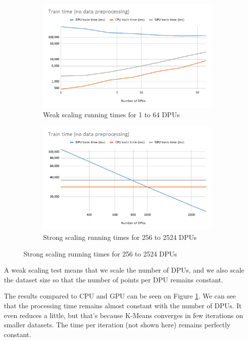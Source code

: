 \begin{figure}
    \begin{subfigure}{0.48\linewidth}
        \includegraphics[width=\linewidth]{figures/KMeansweak.pdf}
        \caption{Weak scaling running times for 1 to 64 DPUs}
        \label{fig:KMeansweak}
    \end{subfigure}
    \begin{subfigure}{0.48\linewidth}
        \includegraphics[width=\linewidth]{figures/KMeansstrong.pdf}
        \caption{Strong scaling running times for 256 to 2524 DPUs}
        \label{fig:KMeansstrong}
    \end{subfigure}
\end{figure}

A weak scaling test means that we scale the number of DPUs, and we also scale the dataset size so that the number of points per DPU remains constant.

The results compared to CPU and GPU can be seen on Figure \ref{fig:KMeansweak}. We can see that the processing time remains almost constant with the number of DPUs. It even reduces a little, but that's because K-Means converges in few iterations on smaller datasets. The time per iteration (not shown here) remains perfectly constant.

